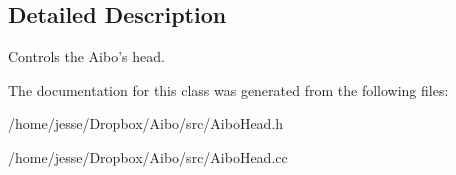 \subsection{Detailed Description}
Controls the Aibo's head. 

The documentation for this class was generated from the following files:\begin{DoxyCompactItemize}
\item 
/home/jesse/Dropbox/Aibo/src/AiboHead.h\item 
/home/jesse/Dropbox/Aibo/src/AiboHead.cc\end{DoxyCompactItemize}
